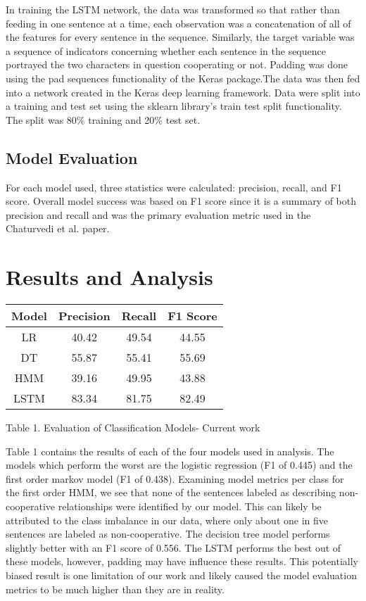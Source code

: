 \documentclass[11pt,a4paper]{article}
\begin{document}
In training the LSTM network, the data was transformed so that rather than feeding in one sentence at a time, each observation was a concatenation of all of the features for every sentence in the sequence. Similarly, the target variable was a sequence of indicators concerning whether each sentence in the sequence portrayed the two characters in question cooperating or not. Padding was done using the pad sequences functionality of the Keras package.The data was then fed into a network created in the Keras deep learning framework. Data were split into a training and test set using the sklearn library's train test split functionality. The split was 80\% training and 20\% test set.

\subsection{Model Evaluation}

For each model used, three statistics were calculated: precision, recall, and F1 score. Overall model success was based on F1 score since it is a summary of both precision and recall and was the primary evaluation metric used in the Chaturvedi et al. paper.

\section{Results and Analysis}

\begin{center}
 \begin{tabular}{||c c c c||} 
 \hline
 Model & Precision & Recall & F1 Score \\ [0.5ex] 
 \hline\hline
 LR & 40.42 & 49.54 & 44.55 \\ 
 \hline
 DT & 55.87 & 55.41 & 55.69 \\
 \hline
 HMM & 39.16 & 49.95 & 43.88 \\
 \hline
 LSTM & 83.34 & 81.75 & 82.49 \\
 \hline
\end{tabular}
\end{center}
\caption{Table 1. Evaluation of Classification Models- Current work}
\label{table:1}


Table 1 contains the results of each of the four models used in analysis. The models which perform the worst are the logistic regression (F1 of 0.445) and the first order markov model (F1 of 0.438). Examining model metrics per class for the first order HMM, we see that none of the sentences labeled as describing non-cooperative relationships were identified by our model. This can likely be attributed to the class imbalance in our data, where only about one in five sentences are labeled as non-cooperative. The decision tree model performs slightly better with an F1 score of 0.556. The LSTM performs the best out of these models, however, padding may have influence these results. This potentially biased result is one limitation of our work and likely caused the model evaluation metrics to be much higher than they are in reality. 
\end{document}
